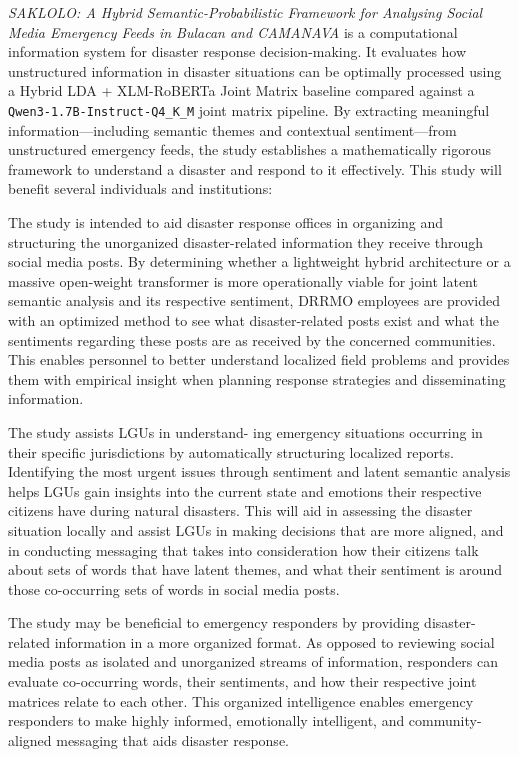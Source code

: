 \documentclass[12pt,a4paper]{report}
\newcommand{\qwen}{\texttt{Qwen3-1.7B-Instruct-Q4\_K\_M}}
\newcommand{\xlmr}{XLM-RoBERTa}
\begin{document}
\emph{SAKLOLO: A Hybrid Semantic-Probabilistic Framework for Analysing Social
Media Emergency Feeds in Bulacan and CAMANAVA} is a computational information
system for disaster response decision-making. It evaluates how unstructured
information in disaster situations can be optimally processed using a Hybrid
LDA + \xlmr{} Joint Matrix baseline compared against a \qwen{} joint matrix
pipeline. By extracting meaningful information---including semantic themes and
contextual sentiment---from unstructured emergency feeds, the study establishes
a mathematically rigorous framework to understand a disaster and respond to it
effectively. This study will benefit several individuals and institutions:

\begin{description}[style=sameline,leftmargin=0pt]
  \item[Bulacan and CAMANAVA Disaster Response Offices.] The study is
  intended to aid disaster response offices in organizing and structuring the
  unorganized disaster-related information they receive through social media
  posts. By determining whether a lightweight hybrid architecture or a massive
  open-weight transformer is more operationally viable for joint latent
  semantic analysis and its respective sentiment, DRRMO employees are provided
  with an optimized method to see what disaster-related posts exist and what
  the sentiments regarding these posts are as received by the concerned
  communities. This enables personnel to better understand localized field
  problems and provides them with empirical insight when planning response
  strategies and disseminating information.

  \item[Local Government Units (LGUs).] The study assists LGUs in understand-
  ing emergency situations occurring in their specific jurisdictions by
  automatically structuring localized reports. Identifying the most urgent
  issues through sentiment and latent semantic analysis helps LGUs gain
  insights into the current state and emotions their respective citizens have
  during natural disasters. This will aid in assessing the disaster situation
  locally and assist LGUs in making decisions that are more aligned, and in
  conducting messaging that takes into consideration how their citizens talk
  about sets of words that have latent themes, and what their sentiment is
  around those co-occurring sets of words in social media posts.

  \item[Emergency Responders.] The study may be beneficial to emergency
  responders by providing disaster-related information in a more organized
  format. As opposed to reviewing social media posts as isolated and
  unorganized streams of information, responders can evaluate co-occurring
  words, their sentiments, and how their respective joint matrices relate to
  each other. This organized intelligence enables emergency responders to make
  highly informed, emotionally intelligent, and community-aligned messaging
  that aids disaster response.


\end{description}
\end{document}
